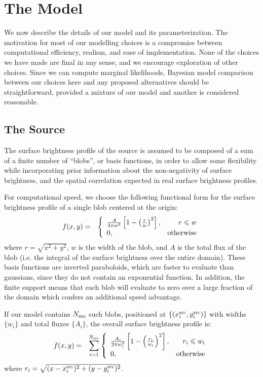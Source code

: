\documentclass[useAMS,usenatbib]{mn2e}
\begin{document}
\section{The Model}
We now describe the details of our model and its parameterization. The
motivation for most of our modelling choices is a compromise between
computational efficiency, realism, and ease of implementation. None of the
choices we have made are final in any sense, and we encourage exploration of
other choices. Since we can compute marginal likelihoods, Bayesian model
comparison between our choices here and any proposed alternatives should be
straightforward, provided a mixture of our model and another is considered
reasonable.

\subsection{The Source}
The surface brightness profile of the source is assumed to be composed of
a sum of a finite number of ``blobs'', or basis functions, in order to
allow some flexibility while incorporating prior information about the
non-negativity of surface brightness, and the spatial correlation expected
in real surface brightness profiles.

For computational speed, we choose the following
functional form for the surface brightness profile
of a single blob centered at the origin:
\begin{eqnarray}
f(x, y) &=& \left\{
\begin{array}{lr}
\frac{A}{2\pi w^2}\left[1 - \left(\frac{r}{w}\right)^2\right], & r \leq w\\
0, & \textnormal{otherwise}
\end{array}
\right.
\end{eqnarray}
where $r = \sqrt{x^2 + y^2}$, $w$ is the width of the blob, and $A$ is the
total flux of the blob (i.e. the integral of the surface brightness over the
entire domain).
These basis functions are inverted paraboloids, which are faster to evaluate
than gaussians, since they do not
contain an exponential function. In addition, the finite support means that
each blob will evaluate to zero over a large fraction of the domain which
confers an additional speed advantage.

If our model contains $N_{\rm src}$ such blobs, positioned at
$\left\{(x_i^{\rm src}, y_i^{\rm src})\right\}$ with widths $\{w_i\}$ and total fluxes
$\{A_i\}$, the overall surface brightness profile is:
\begin{eqnarray}
f(x, y) &=& \sum_{i=1}^{N_{\rm src}}\left\{
\begin{array}{lr}
\frac{A_i}{2\pi w_i^2}\left[1 - \left(\frac{r_i}{w_i}\right)^2\right], & r_i \leq w_i\\
0, & \textnormal{otherwise}
\end{array}
\right.
\end{eqnarray}
where $r_i = \sqrt{(x - x_i^{\rm src})^2 + (y - y_i^{\rm src})^2}$.
\end{document}
